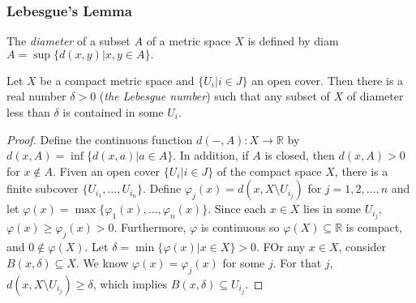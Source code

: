 \subsubsection{Lebesgue's Lemma}

\label{diameter}
The \emph{diameter} of a subset $A$ of a metric space $X$ is defined by diam $A = \sup\{d(x,y) | x,y \in A \}.$

\begin{lemma}
\label{lebesguelemma}
Let $X$ be a compact metric space and $\{ U_i | i \in J \}$ an open cover. Then there is a real number
$\delta > 0$ (\emph{the Lebesgue number}\label{lebesguenumber}) such that any subset of $X$ of diameter less than $\delta$
is contained in some $U_i$.
\end{lemma}

\begin{proof}
Define the continuous function $d(-,A): X \rightarrow \mathbb{R}$ by $d(x, A) = \inf\{d(x,a) | a \in A \}$. In addition,
if $A$ is closed, then $d(x,A) > 0$ for $x \not \in A$. Fiven an open cover $\{ U_i | i \in J \}$ of the compact space $X$,
there is a finite subcover $\{U_{i_1},\dots, U_{i_n} \}$. Define $\varphi_j(x) = d(x,X \setminus U_{i_j})$ for $j = 1,2,\dots, n$
and let $\varphi(x) = \max\{\varphi_1(x), \dots, \varphi_n(x) \}$. Since each $x \in X$ lies in some $U_{i_j}$, $\varphi(x) \geq \varphi_j(x) > 0$.
Furthermore, $\varphi$ is continuous so $\varphi(X) \subseteq \mathbb{R}$ is compact, and $0 \not \in \varphi(X)$. Let $\delta = \min \{ \varphi(x) | x \in X \} > 0$.
FOr any $x \in X$, consider $B(x, \delta) \subseteq X$. We know $\varphi(x) = \varphi_j(x)$ for some $j$. For that $j$, $d(x,X \setminus U_{i_j}) \geq \delta$, which implies
$B(x, \delta) \subseteq U_{i_j}$.
\end{proof}